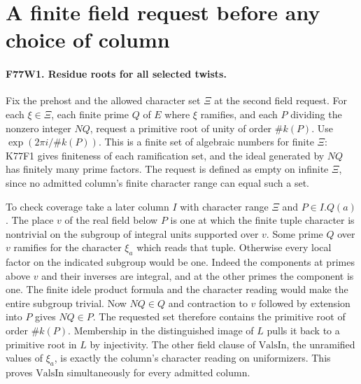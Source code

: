 \section{A finite field request before any choice of column}

\paragraph{F77W1. Residue roots for all selected twists.}
Fix the prehost and the allowed character set $\Xi$ at the second
field request. For each $\xi\in\Xi$, each finite prime $Q$ of $E$
where $\xi$ ramifies, and each $P$ dividing the nonzero integer
$NQ$, request a primitive root of unity of order $\#k(P)$.
Use $\exp(2\pi i/\#k(P))$. This is a finite set of algebraic
numbers for finite $\Xi$: K77F1 gives finiteness of each ramification
set, and the ideal generated by $NQ$ has finitely many prime factors.
The request is defined as empty on infinite $\Xi$, since no admitted
column's finite character range can equal such a set.

To check coverage take a later column $I$ with character range
$\Xi$ and $P\in I.Q(a)$. The place $v$ of the real field below
$P$ is one at which the finite tuple character is nontrivial on
the subgroup of integral units supported over $v$. Some prime
$Q$ over $v$ ramifies for the character $\xi_a$ which reads that
tuple. Otherwise every local factor on the indicated subgroup
would be one. Indeed the components at primes above $v$ and their
inverses are integral, and at the other primes the component is
one. The finite idele product formula and the character reading
would make the entire subgroup trivial. Now $NQ\in Q$ and
contraction to $v$ followed by extension into $P$ gives $NQ\in P$.
The requested set therefore contains the primitive root of order
$\#k(P)$. Membership in the distinguished image of $L$ pulls it
back to a primitive root in $L$ by injectivity. The other field
clause of $\mathrm{ValsIn}$, the unramified values of $\xi_a$,
is exactly the column's character reading on uniformizers. This
proves $\mathrm{ValsIn}$ simultaneously for every admitted column.

